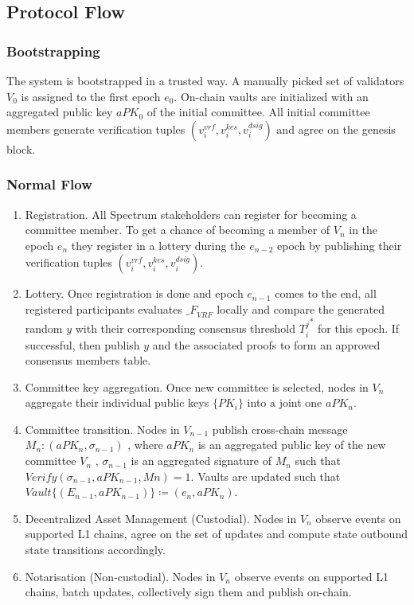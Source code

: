 \subsection{Protocol Flow}\label{subsec:protocol-flow}

\subsubsection{Bootstrapping}\label{subsubsec:bootstrapping}

The system is bootstrapped in a trusted way.
A manually picked set of validators $V_0$ is assigned to the first epoch $e_0$.
On-chain vaults are initialized with an aggregated public key $aPK_0$ of the initial committee.
All initial committee members generate verification tuples ${(v_i^{vrf}, v_i^{kes}, v_i^{dsig})}$
and agree on the genesis block.

\subsubsection{Normal Flow}\label{subsubsec:normal-flow}

\begin{enumerate}
    \item Registration.
    All Spectrum stakeholders can register for becoming a committee member.
    To get a chance of becoming a member of $V_n$ in the epoch $e_n$ they register in a lottery during the $e_{n-2}$
    epoch by publishing their verification tuples ${(v_i^{vrf}, v_i^{kes}, v_i^{dsig})}$.
    \item Lottery.
    Once registration is done and epoch $e_{n-1}$ comes to the end, all registered participants evaluates
    ${\mathcal_{F}}_{VRF}$ locally and compare the generated random $y$ with their corresponding consensus threshold
    ${T_i^j}^*$ for this epoch.
    If successful, then publish $y$ and the associated proofs to form an approved consensus members table.
    \item Committee key aggregation.
    Once new committee is selected, nodes in $V_n$ aggregate their individual public keys $\{PK_i\}$ into
    a joint one $aPK_n$.
    \item Committee transition.
    Nodes in $V_{n-1}$ publish cross-chain message ${M_n : (aPK_n, \sigma_{n-1})}$ , where $aPK_n$ is
    an aggregated public key of the new committee $V_n$ , $\sigma_{n-1}$ is an aggregated signature of
    $M_n$ such that ${Verify(\sigma_{n-1}, aPK_{n-1}, Mn) = 1}$.
    Vaults are updated such that ${Vault\{(E_{n-1}, aPK_{n-1})\} \coloneqq (e_n, aPK_n)}$.
    \item Decentralized Asset Management (Custodial).
    Nodes in $V_n$ observe events on supported L1 chains, agree on the set of updates
    and compute state outbound state transitions accordingly.
    \item Notarisation (Non-custodial).
    Nodes in $V_n$ observe events on supported L1 chains, batch updates, collectively sign them and
    publish on-chain.
\end{enumerate}